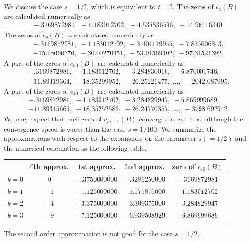 \documentclass[12pt]{amsart}
\numberwithin{equation}{section}
\theoremstyle{definition}
\theoremstyle{remark}
\begin{document}
We discuss the case $s=1/2$, which is equivalent to $t=2$.
The zeros of $c_{4}(B) $ are calculated numerically as
\begin{align*}
& -.3169872981, \; -1.183012702, \; -4.535836596, \; -14.96416340.
\end{align*}
The zeros of $c_{8} (B)$ are calculated numerically as
\begin{align*}
& -.3169872981, \; -1.183012702, \; -3.404179955, \; -7.875606843, \\
& -15.98660376 , \; -30.00270451, \; -53.91569102, \; -97.31521392.
\end{align*}
A part of the zeros of $c_{30} (B)$ are calculated numerically as
\begin{align*}
& -.3169872981, \; -1.183012702, \; -3.284830016, \; -6.870001746, \\
& -11.89319364 , \; -18.35299952, \; -26.25221475, \; \dots , \; -2042.087995 .
\end{align*}
A part of the zeros of $c_{40} (B)$ are calculated numerically as
\begin{align*}
& -.3169872981, \; -1.183012702, \; -3.284829947, \; -6.869999689, \\
& -11.89315665 , \; -18.35252588, \; -26.24770357, \; \dots , \; -3798.692942 .
\end{align*}
We may expect that each zero of $c_{m+1} (B)$ converges as $m \to \infty $, although the convergence speed is worse than the case $s=1/100$.
We summarize the approximations with respect to the expansions on the parameter $s(=1/2)$ and the numerical calculation as the following table.
\begin{center}
\begin{tabular}{c|c|c|c|c}
& $0$th approx. & $1$st approx. & $2$nd approx. & zero of $ c_{40} (B) $ \\  \hline
$k=0$ & $0$ & $-.3750000000 $ & $-.3281250000 $ & $-.3169872981$ \\
$k=1$ & $-1$ & $-1.125000000 $ & $-1.171875000 $ & $-1.183012702$ \\
$k=2$ & $-4$ & $-3.375000000 $ & $-3.309375000 $ & $-3.284829947$ \\
$k=3$ & $-9$ & $-7.125000000 $ & $-6.939508929 $ & $-6.869999689$
\end{tabular}
\end{center}
The second order approximation is not good for the case $s=1/2$.
\end{document}
